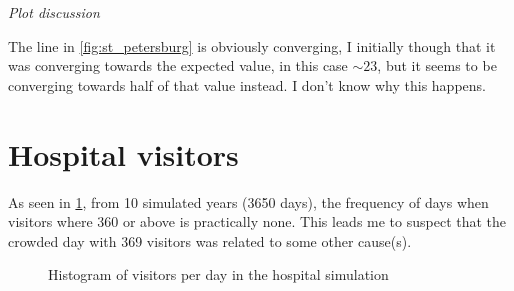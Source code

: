 \documentclass[11pt, a4paper]{article}
\begin{document}
\textit{Plot discussion}

\vspace{2mm}\noindent
The line in \ref{fig:st_petersburg} is obviously converging, I initially though that it was converging towards the expected value, in this case $\sim 23$,
but it seems to be converging towards half of that value instead. I don't know why this happens.


\section{Hospital visitors}

As seen in \ref{fig:hospital}, from 10 simulated years (3650 days), the frequency of days when visitors where 360 or above is practically none. This leads me to suspect that the 
crowded day with 369 visitors was related to some other cause(s).

\begin{figure}[ht]
	\label{fig:hospital}
	\centering
	\caption{Histogram of visitors per day in the hospital simulation}
	\scriptsize
	
\end{figure}


\end{document}
